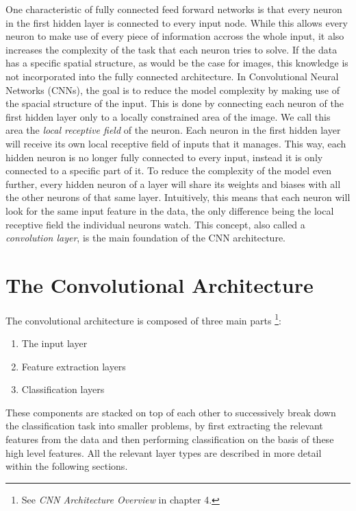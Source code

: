 One characteristic of fully connected feed forward networks is that
every neuron in the first hidden layer is connected to every input
node. While this allows every neuron to make use of every piece of
information accross the whole input, it also increases the complexity
of the task that each neuron tries to solve. If the data has a
specific spatial structure, as would be the case for images, this
knowledge is not incorporated into the fully connected
architecture. In Convolutional Neural Networks (CNNs), the goal is to
reduce the model complexity by making use of the spacial structure of
the input. This is done by connecting each neuron of the first hidden
layer only to a locally constrained area of the image. We call this
area the \textit{local receptive field} of the neuron. Each neuron in
the first hidden layer will receive its own local receptive field of
inputs that it manages. This way, each hidden neuron is no longer
fully connected to every input, instead it is only connected to a
specific part of it. To reduce the complexity of the model even
further, every hidden neuron of a layer will share its weights and
biases with all the other neurons of that same layer. Intuitively, this
means that each neuron will look for the same input feature in the
data, the only difference being the local receptive field the
individual neurons watch. This concept, also called a
\textit{convolution layer}, is the main foundation of the CNN
architecture.

\section{The Convolutional Architecture}

The convolutional architecture is composed of three main parts
\cite{Patterson}\footnote{See \textit{CNN Architecture Overview} in
  chapter 4.}:
\begin{enumerate}
  \item The input layer
  \item Feature extraction layers
  \item Classification layers
\end{enumerate}
These components are stacked on top of each other to successively
break down the classification task into smaller problems, by first
extracting the relevant features from the data and then performing
classification on the basis of these high level features. All the
relevant layer types are described in more detail within the following
sections.

